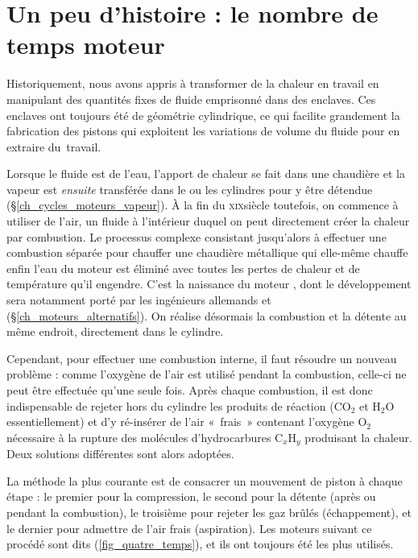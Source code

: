 \atstartofhistorysection
\section[Un peu d’histoire : le nombre de temps moteur]{Un peu d’histoire :\onlyamphibook{\\} le nombre de temps moteur}
\label{ch_deux_temps}

	Historiquement, nous avons appris à transformer de la chaleur en travail en manipulant des quantités fixes de fluide emprisonné dans des enclaves. Ces enclaves ont toujours été de géométrie cylindrique, ce qui facilite grandement la fabrication des pistons qui exploitent les variations de volume du fluide pour en extraire du~travail.
	
	Lorsque le fluide est de l’eau, l’apport de chaleur se fait dans une chaudière et la vapeur est \emph{ensuite} transférée dans le ou les cylindres pour y être détendue (\S\ref{ch_cycles_moteurs_vapeur}). À la fin du \textsc{xix}\ieme siècle toutefois, on commence à utiliser de l’air, un fluide à l’intérieur duquel on peut directement créer la chaleur par combustion. Le processus complexe consistant jusqu’alors à effectuer une combustion séparée pour chauffer une chaudière métallique qui elle-même chauffe enfin l’eau du moteur est éliminé avec toutes les pertes de chaleur et de température qu’il engendre. C’est la naissance du moteur , dont le développement sera notamment porté par les ingénieurs allemands  et  (\S\ref{ch_moteurs_alternatifs}). On réalise désormais la combustion et la détente au même endroit, directement dans le cylindre.
	
	Cependant, pour effectuer une combustion interne, il faut résoudre un nouveau problème : comme l’oxygène de l’air est utilisé pendant la combustion, celle-ci ne peut être effectuée qu’une seule fois. Après chaque combustion, il est donc indispensable de rejeter hors du cylindre les produits de réaction ($\text{CO}_2$ et $\text{H}_2\text{O}$ essentiellement) et d’y ré-insérer de l’air «~frais~» contenant l’oxygène $\text{O}_2$ nécessaire à la rupture des molécules d’hydrocarbures $\text{C}_x\text{H}_y$ produisant la chaleur. Deux solutions différentes sont alors adoptées.
	
	La méthode la plus courante est de consacrer un mouvement de piston à chaque étape : le premier pour la compression, le second pour la détente (après ou pendant la combustion), le troisième pour rejeter les gaz brûlés (échappement), et le dernier pour admettre de l’air frais (aspiration). Les moteurs suivant ce procédé sont dits  (\cref{fig_quatre_temps}), et ils ont toujours été les plus utilisés.
	
